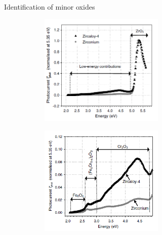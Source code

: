 \documentclass[10pt,compress]{beamer}
\newcommand{\coef}{1}
\begin{document}
\begin{frame}[allowframebreaks=1.0]{Identification of minor oxides}
        \renewcommand{\coef}{0.45}
        \begin{figure}[h]
            \centering
            \begin{subfigure}{\coef\textwidth}
                \centering
                \includegraphics[width=0.65\textwidth]{./src/figures/Benaboud2007-Fig4.png}
                \caption{}
                \label{fig_benaboud_minor_oxides_a}
            \end{subfigure}
            \begin{subfigure}{\coef\textwidth}
                \centering
                \includegraphics[width=0.65\textwidth]{./src/figures/Benaboud2007-Fig5.png}
                \caption{}
                \label{fig_benaboud_minor_oxides_b}
            \end{subfigure}
            
            \label{fig_benaboud_minor_oxides}
        \end{figure}
    \end{frame}
\end{document}
